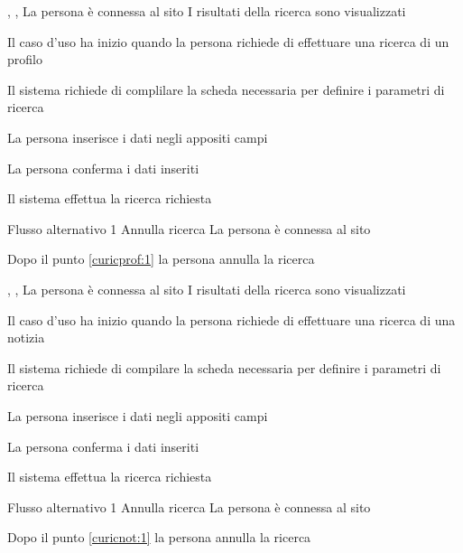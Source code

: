 \tabcuvspace

{, , }
{La persona è connessa al sito}
{I risultati della ricerca sono visualizzati}
{\begin{enumCU}
	\item Il caso d'uso ha inizio quando la persona richiede di effettuare una ricerca di un profilo
	\item Il sistema richiede di complilare la scheda necessaria per definire i parametri di ricerca
	\item La persona inserisce i dati negli appositi campi \label{curicprof:1}
	\item La persona conferma i dati inseriti
	\item Il sistema effettua la ricerca richiesta
\end{enumCU}}
%
{Flusso alternativo 1}%
{Annulla ricerca}%
{La persona è connessa al sito}%
{\postNulle}%
{\begin{enumCU}
		\item Dopo il punto \ref{curicprof:1} la persona annulla la ricerca
	\end{enumCU}}%

\tabcuvspace

{, , }
{La persona è connessa al sito}
{I risultati della ricerca sono visualizzati}
{\begin{enumCU}
	\item Il caso d'uso ha inizio quando la persona richiede di effettuare una ricerca di una notizia
	\item Il sistema richiede di compilare la scheda necessaria per definire i parametri di ricerca
	\item La persona inserisce i dati negli appositi campi \label{curicnot:1}
	\item La persona conferma i dati inseriti
	\item Il sistema effettua la ricerca richiesta
\end{enumCU}}
%
{Flusso alternativo 1}%
{Annulla ricerca}%
{La persona è connessa al sito}%
{\postNulle}%
{\begin{enumCU}
		\item Dopo il punto \ref{curicnot:1} la persona annulla la ricerca
	\end{enumCU}}%

